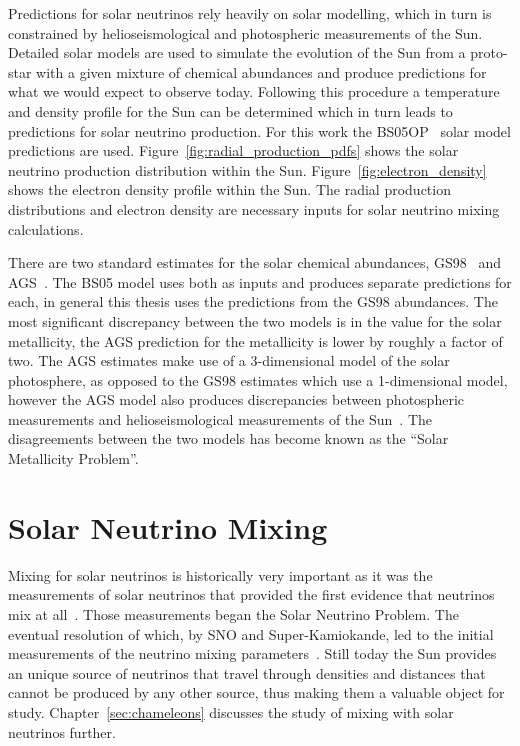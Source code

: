Predictions for solar neutrinos rely heavily on solar modelling, which in turn
is constrained by helioseismological and photospheric measurements of the Sun.
Detailed solar models are used to simulate the evolution of the Sun from a proto-star
with a given mixture of chemical abundances and produce predictions for
what we would expect to observe today.
Following this procedure a temperature and density profile for the Sun can be determined
which in turn leads to predictions for solar neutrino production.
For this work the BS05OP~\citep{bs_ssm} solar model predictions are used.
Figure~\ref{fig:radial_production_pdfs} shows the solar neutrino production
distribution within the Sun.
Figure~\ref{fig:electron_density} shows the electron density profile within
the Sun.
The radial production distributions and electron density are necessary inputs
for solar neutrino mixing calculations.

There are two standard estimates for the solar chemical abundances,
GS98~\citep{gs98} and AGS~\citep{ags}.
The BS05 model uses both as inputs and produces separate predictions for each,
in general this thesis uses the predictions from the GS98 abundances.
The most significant discrepancy between the two models is in the value
for the solar metallicity, the AGS prediction for the metallicity is
lower by roughly a factor of two.
The AGS estimates make use of a 3-dimensional model of the solar photosphere,
as opposed to the GS98 estimates which use a 1-dimensional model, however
the AGS model also produces discrepancies between photospheric measurements
and helioseismological measurements of the Sun~\citep{ags, bahcall01}.
The disagreements between the two models has become known as the
``Solar Metallicity Problem''.


\section{Solar Neutrino Mixing}
\label{sec:solar_nu_mixing}
Mixing for solar neutrinos is historically very important as it was
the measurements of solar neutrinos that provided the first evidence that
neutrinos mix at all~\citep{homestake,solar_nu_problem}.
Those measurements began the Solar Neutrino Problem.
The eventual resolution of which, by SNO and Super-Kamiokande,
led to the initial measurements of the neutrino mixing parameters~\citep{superk_atmospherics,
sno_second}.
Still today the Sun provides an unique source of neutrinos that travel through
densities and distances that cannot be produced by any other source, thus making
them a valuable object for study.
Chapter~\ref{sec:chameleons} discusses the study of mixing with
solar neutrinos further.

